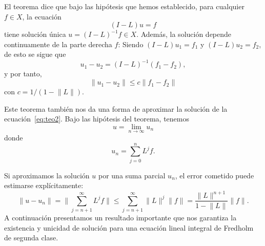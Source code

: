 \begin{observacion}
	El teorema dice que bajo las hipótesis que hemos establecido, para cualquier $f \in X$, la ecuación
	\begin{equation}\label{eq:teo2}
		(I-L)u = f
	\end{equation}
	tiene solución única $u = (I-L)^{-1}f \in X$. Además, la solución depende continuamente de la parte derecha $f$: Siendo $(I-L)u_1 = f_1$ y $(I-L)u_2 = f_2$, de esto se sigue que
	\begin{equation}
		u_1 - u_2 = (I-L)^{-1}(f_1 - f_2),
	\end{equation}
	y por tanto,
	\begin{equation}
		\lVert u_1 - u_2 \rVert \leqslant c \lVert f_1 - f_2 \rVert
	\end{equation}
	con $c = 1/(1 - \lVert L \rVert)$.
\end{observacion}
\begin{observacion}
	Este teorema también nos da una forma de aproximar la solución de la ecuación~\eqref{eq:teo2}. Bajo las hipótesis del teorema, tenemos
	\begin{equation}
		u = \lim_{n \rightarrow \infty}u_n
	\end{equation}
	donde
	\begin{equation}
		u_n = \sum_{j=0}^{n}L^jf.
	\end{equation}
\end{observacion}
Si aproximamos la solución $u$ por una suma parcial $u_n$, el error cometido puede estimarse explícitamente:
\begin{equation}
	\lVert u-u_n \rVert = \lVert \sum_{j=n+1}^\infty L^jf \rVert \leqslant \sum_{j=n+1}^\infty \lVert L \rVert^j \lVert f \rVert = \dfrac{\lVert L \rVert^{n+1}}{1-\lVert L \rVert}\lVert f \rVert.
\end{equation}
A continuación presentamos un resultado importante que nos garantiza la existencia y unicidad de solución para una ecuación lineal integral de Fredholm de segunda clase.
